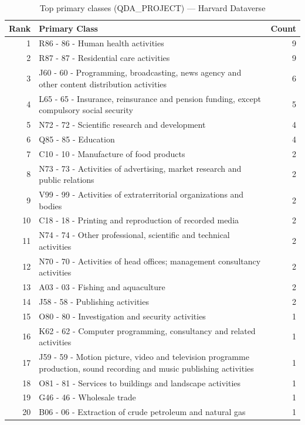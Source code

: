 \begin{table}[H]
    \centering
    \begin{tabular}{r p{10cm} r}
    \hline
    \textbf{Rank} & \textbf{Primary Class} & \textbf{Count} \\
    \hline
    1 & R86 - 86 - Human health activities & 9 \\
    2 & R87 - 87 - Residential care activities & 9 \\
    3 & J60 - 60 - Programming, broadcasting, news agency and other content distribution activities & 6 \\
    4 & L65 - 65 - Insurance, reinsurance and pension funding, except compulsory social security & 5 \\
    5 & N72 - 72 - Scientific research and development & 4 \\
    6 & Q85 - 85 - Education & 4 \\
    7 & C10 - 10 - Manufacture of food products & 2 \\
    8 & N73 - 73 - Activities of advertising, market research and public relations & 2 \\
    9 & V99 - 99 - Activities of extraterritorial organizations and bodies & 2 \\
    10 & C18 - 18 - Printing and reproduction of recorded media & 2 \\
    11 & N74 - 74 - Other professional, scientific and technical activities & 2 \\
    12 & N70 - 70 - Activities of head offices; management consultancy activities & 2 \\
    13 & A03 - 03 - Fishing and aquaculture & 2 \\
    14 & J58 - 58 - Publishing activities & 2 \\
    15 & O80 - 80 - Investigation and security activities & 1 \\
    16 & K62 - 62 - Computer programming, consultancy and related activities & 1 \\
    17 & J59 - 59 - Motion picture, video and television programme production, sound recording and music publishing activities & 1 \\
    18 & O81 - 81 - Services to buildings and landscape activities & 1 \\
    19 & G46 - 46 - Wholesale trade & 1 \\
    20 & B06 - 06 - Extraction of crude petroleum and natural gas & 1 \\
    \hline
    \end{tabular}
    \caption{Top primary classes (QDA\_PROJECT) --- Harvard Dataverse}
\end{table}

